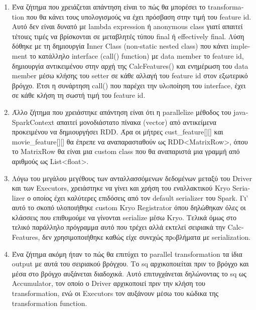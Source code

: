 \documentclass{report}
\begin{document}
{\begin{enumerate}
  \item Ένα ζήτημα που χρειάζεται απάντηση είναι το πώς θα μπορέσει το \textlatin{transformation} που θα κάνει τους υπολογισμούς να έχει πρόσβαση στην τιμή του \textlatin{feature id}. Αυτό δεν είναι δυνατό με \textlatin{lambda expression} ή \textlatin{anonymous class} γιατί απαιτεί τέτοιες τιμές να βρίσκονται σε μεταβλητές τύπου \textlatin{final} ή \textlatin{effectively final}. Λύση δόθηκε με τη δημιουργία \textlatin{Inner Class (non-static nested class)} που κάνει \textlatin{implement} το κατάλληλο \textlatin{interface (call() function)} με \textlatin{data member} το \textlatin{feature id}, δημιουργία αντικειμένου  στην αρχή της \textlatin{CalcFeatures}() και ενημέρωση του \textlatin{data member} μέσω κλήσης του \textlatin{setter} σε κάθε αλλαγή του \textlatin{feature id} στον εξωτερικό βρόγχο. Έτσι η συνάρτηση \textlatin{call}() που παρέχει την υλoποίηση του \textlatin{interface}, έχει σε κάθε κλήση τη σωστή τιμή του \textlatin{feature id}.
  \item Άλλο ζήτημα που χρειάστηκε απάντηση είναι ότι η \textlatin{parallelize} μέθοδος του \textlatin{javaSparkContext} απαιτεί μονοδιάστατο πίνακα \textlatin{(vector)} από αντικείμενα προκειμένου να δημιουργήσει \textlatin{RDD}. Άρα οι μήτρες \textlatin{cust\_feature}[][] και \textlatin{movie\_feature}[][] θα έπρεπε να αναπαρασταθούν ως \textlatin{RDD<MatrixRow>}, όπου το \textlatin{MatrixRow} θα είναι μια \textlatin{custom class} που θα αναπαριστά μια γραμμή από αριθμούς ως \textlatin{List<float>}.
  \item Λόγω του μεγάλου μεγέθους των ανταλλασσόμενων δεδομένων μεταξύ του \textlatin{Driver} και των \textlatin{Executors}, χρειάστηκε να γίνει και χρήση του εναλλακτικού \textlatin{Kryo Serializer} ο οποίος έχει καλύτερες επιδόσεις από τον \textlatin{default serializer} του \textlatin{Spark}. Γι’ αυτό το σκοπό υλοποιήθηκε \textlatin{custom Kryo Registrator} όπου δηλώθηκαν όλες οι κλάσσεις που επιθυμούμε να γίνονται \textlatin{serialize} μέσω \textlatin{Kryo}. Τελικά όμως στο τελικό παράλληλο πρόγραμμα αυτό που τρέχει αλλά εκτελεί σειριακά την \textlatin{CalcFeatures}, δεν χρησιμοποιήθηκε καθώς είχε συνεχώς πρoβλήματα με \textlatin{serialization}.
  \item Ένα ζήτημα ακόμη ήταν το πώς θα επιτύχει το \textlatin{parallel transformation} τα ίδια \textlatin{output} με αυτά του σειριακού βρόγχου. Το \textlatin{sq} αρχικοποιείται πριν το βρόγχο και μέσα στο βρόγχο αυξάνεται διαδοχικά. Αυτό επιτυγχάνεται δηλώνοντας το \textlatin{sq} ως \textlatin{Accumulator}, τον οποίο ο \textlatin{Driver} αρχικοποιεί πριν την κλήση του transformation, ενώ οι Executors τον αυξάνουν μέσω του κώδικα της transformation function.

\end{enumerate}}
\end{document}
